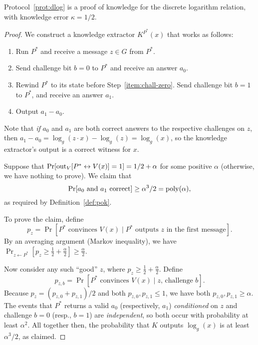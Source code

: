 \documentclass[11pt]{article}
\begin{document}
\begin{theorem}
  Protocol~\ref{prot:dlog} is a proof of knowledge for the discrete
  logarithm relation, with knowledge error $\kappa = 1/2$.
\end{theorem}

\begin{proof}
  We construct a knowledge extractor $K^{P^{*}}(x)$ that works as
  follows:
  \begin{enumerate}
  \item Run $P^{*}$ and receive a message $z \in G$ from $P^{*}$.
  \item Send challenge bit $b = 0$ to $P^{*}$ and receive an answer
    $a_{0}$.\label{item:chall-zero}
  \item Rewind $P^{*}$ to its state before Step~\ref{item:chall-zero}.
    Send challenge bit $b = 1$ to $P^{*}$, and receive an answer
    $a_{1}$.
  \item Output $a_{1} - a_{0}$.
  \end{enumerate}

  Note that \emph{if} $a_{0}$ and $a_{1}$ are both correct answers to
  the respective challenges on $z$, then $a_{1} - a_{0} = \log_{g}(z
  \cdot x) - \log_{g}(z) = \log_{g}(x)$, so the knowledge extractor's
  output is a correct witness for $x$.

  Suppose that $\Pr[\text{out}_{V}[P^{*} \leftrightarrow V(x)] = 1] = 1/2 +
  \alpha$ for some positive $\alpha$ (otherwise, we have nothing to
  prove).  We claim that \[ \Pr[a_{0} \text{ and } a_{1} \text{
    correct}] \geq \alpha^{3}/2 = \operatorname{poly}(\alpha), \] as required by
  Definition~\ref{def:pok}.

  To prove the claim, define \[ p_{z} = \Pr[P^{*} \text{ convinces }
  V(x) \mid P^{*} \text{ outputs $z$ in the first message}]. \] By an
  averaging argument (Markov inequality), we have $\Pr_{z \gets
    P^{*}}[p_{z} \geq \tfrac{1}{2} + \tfrac{\alpha}{2}] \geq
  \frac{\alpha}{2}$.

  Now consider any such ``good'' $z$, where $p_{z} \geq \tfrac12 +
  \tfrac{\alpha}{2}$.  Define \[ p_{z, b} = \Pr[P^{*} \text{ convinces
  } V(x) \mid z \text{, challenge $b$}]. \] Because $p_{z} = (p_{z,0}
  + p_{z,1})/2$ and both $p_{z,0}, p_{z,1} \leq 1$, we have both
  $p_{z, 0}, p_{z, 1} \geq \alpha$.  The events that $P^{*}$ returns a
  valid $a_{0}$ (respectively, $a_{1}$) \emph{conditioned} on $z$ and
  challenge $b=0$ (resp., $b=1$) are \emph{independent}, so both occur
  with probability at least $\alpha^{2}$.  All together then, the
  probability that $K$ outputs $\log_{g}(x)$ is at least
  $\alpha^{3}/2$, as claimed.

\end{proof}
\end{document}
